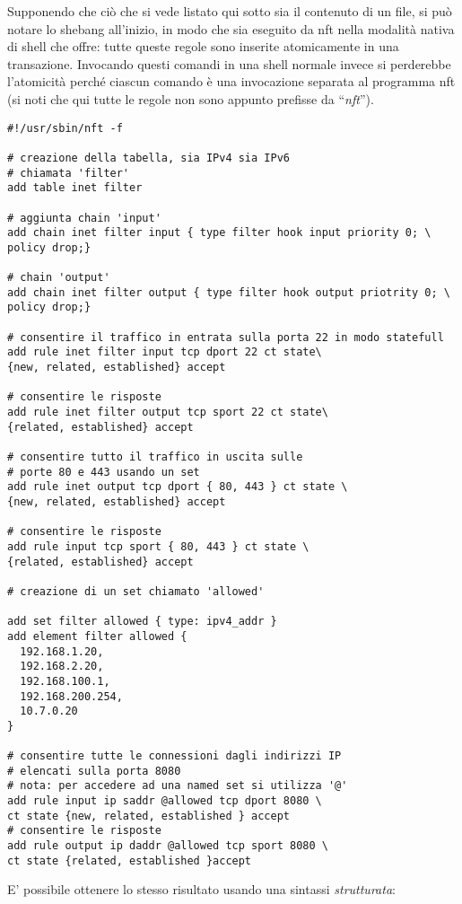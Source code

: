 Supponendo che ciò che si vede listato qui sotto sia il contenuto di un file,
si può notare lo shebang all'inizio, in modo che sia eseguito da nft nella
modalità nativa di shell che offre: tutte queste regole sono inserite atomicamente
in una transazione. Invocando questi comandi in una shell normale invece si
perderebbe l'atomicità perché ciascun comando è una invocazione separata al programma nft
(si noti che qui tutte le regole non sono appunto prefisse da ``\textit{nft}'').
\begin{verbatim}
#!/usr/sbin/nft -f

# creazione della tabella, sia IPv4 sia IPv6
# chiamata 'filter'
add table inet filter

# aggiunta chain 'input'
add chain inet filter input { type filter hook input priority 0; \
policy drop;}

# chain 'output'
add chain inet filter output { type filter hook output priotrity 0; \
policy drop;}

# consentire il traffico in entrata sulla porta 22 in modo statefull
add rule inet filter input tcp dport 22 ct state\
{new, related, established} accept

# consentire le risposte
add rule inet filter output tcp sport 22 ct state\
{related, established} accept

# consentire tutto il traffico in uscita sulle
# porte 80 e 443 usando un set
add rule inet output tcp dport { 80, 443 } ct state \
{new, related, established} accept

# consentire le risposte
add rule input tcp sport { 80, 443 } ct state \
{related, established} accept

# creazione di un set chiamato 'allowed'

add set filter allowed { type: ipv4_addr }
add element filter allowed {
  192.168.1.20,
  192.168.2.20,
  192.168.100.1,
  192.168.200.254,
  10.7.0.20
}

# consentire tutte le connessioni dagli indirizzi IP
# elencati sulla porta 8080
# nota: per accedere ad una named set si utilizza '@'
add rule input ip saddr @allowed tcp dport 8080 \
ct state {new, related, established } accept
# consentire le risposte
add rule output ip daddr @allowed tcp sport 8080 \
ct state {related, established }accept
\end{verbatim}
E' possibile ottenere lo stesso risultato usando una sintassi \textit{strutturata}:

